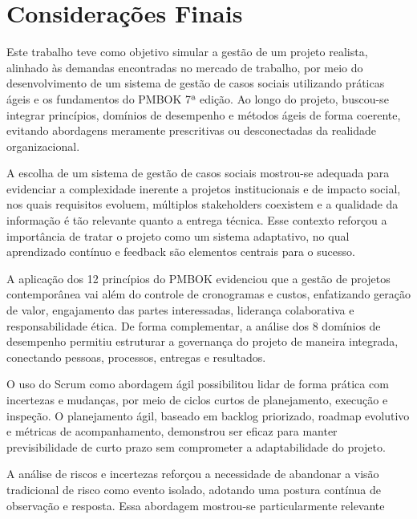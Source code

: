 \chapter{Considerações Finais}\label{chp:ConsideracoesFinais}

Este trabalho teve como objetivo simular a gestão de um projeto realista, alinhado às demandas encontradas no mercado de trabalho, por meio do desenvolvimento de um sistema de gestão de casos sociais utilizando práticas ágeis e os fundamentos do PMBOK 7ª edição. Ao longo do projeto, buscou-se integrar princípios, domínios de desempenho e métodos ágeis de forma coerente, evitando abordagens meramente prescritivas ou desconectadas da realidade organizacional.

A escolha de um sistema de gestão de casos sociais mostrou-se adequada para evidenciar a complexidade inerente a projetos institucionais e de impacto social, nos quais requisitos evoluem, múltiplos stakeholders coexistem e a qualidade da informação é tão relevante quanto a entrega técnica. Esse contexto reforçou a importância de tratar o projeto como um sistema adaptativo, no qual aprendizado contínuo e feedback são elementos centrais para o sucesso.

A aplicação dos 12 princípios do PMBOK evidenciou que a gestão de projetos contemporânea vai além do controle de cronogramas e custos, enfatizando geração de valor, engajamento das partes interessadas, liderança colaborativa e responsabilidade ética. De forma complementar, a análise dos 8 domínios de desempenho permitiu estruturar a governança do projeto de maneira integrada, conectando pessoas, processos, entregas e resultados.

O uso do Scrum como abordagem ágil possibilitou lidar de forma prática com incertezas e mudanças, por meio de ciclos curtos de planejamento, execução e inspeção. O planejamento ágil, baseado em backlog priorizado, roadmap evolutivo e métricas de acompanhamento, demonstrou ser eficaz para manter previsibilidade de curto prazo sem comprometer a adaptabilidade do projeto.

A análise de riscos e incertezas reforçou a necessidade de abandonar a visão tradicional de risco como evento isolado, adotando uma postura contínua de observação e resposta. Essa abordagem mostrou-se particularmente relevante
